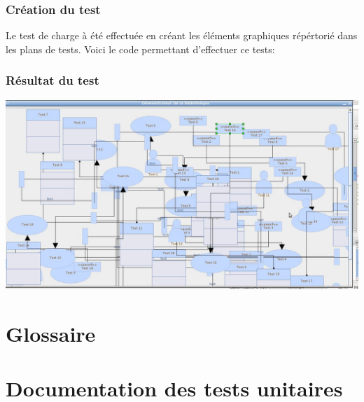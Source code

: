 \documentclass[12pt,a4paper,openany]{report}
\begin{document}
	\subsection{Création du test}
	Le test de charge à été effectuée en créant les éléments graphiques répértorié dans les plans de tests. Voici le code permettant d'effectuer ce tests:
	
	\subsection{Résultat du test}
	\includegraphics[width=25cm, angle=90]{testCharge.jpg}
	\closeout\glossaireVar
	\appendix	
	\chapter{Glossaire}
	\begin{sortedlist}
		
	\end{sortedlist}

	\chapter{Documentation des tests unitaires}
	\label{junitdoc}
	
\end{document}
